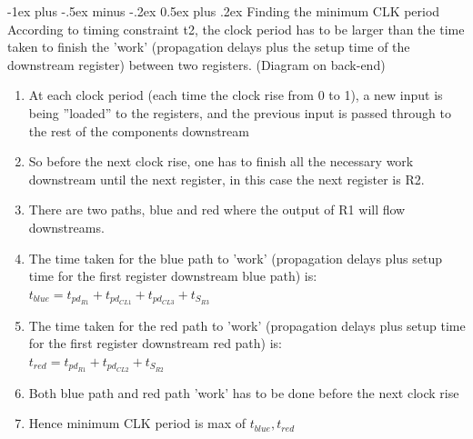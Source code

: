 \documentclass[9pt,landscape]{extarticle}
\makeatletter
\renewcommand{\section}{\@startsection{section}{1}{0mm}%
                                {-1ex plus -.5ex minus -.2ex}%
                                {0.5ex plus .2ex}%
                                {\normalfont\large\bfseries}}
\makeatother
\begin{document}
\begin{multicols*}{4}



\section{Finding the minimum CLK period}
According to timing constraint t2, the clock period has to be larger than the time
taken to finish the ’work’ (propagation delays plus the setup time of the downstream
register) between two registers. (Diagram on back-end)

\begin{enumerate}
\item At each clock period (each time the clock rise from 0 to 1), a new input is being
”loaded” to the registers, and the previous input is passed through to the rest
of the components downstream
\item So before the next clock rise, one has to finish all the necessary work downstream
until the next register, in this case the next register is R2.
\item There are two paths, blue and red where the output of R1 will flow downstreams.
\item The time taken for the blue path to ’work’ (propagation delays plus setup time
for the first register downstream blue path) is: \\
$t_{blue} = t_{pd_{R1}}+ t_{pd_{CL1}} + t_{pd_{CL3}} + t_{S_{R3}}$ \\
\item The time taken for the red path to ’work’ (propagation delays plus setup time
for the first register downstream red path) is: \\
$t_{red} = t_{pd_{R1}}+ t_{pd_{CL2}} + t_{S_{R2}}$ \\
\item Both blue path and red path ’work’ has to be done before the next clock rise 
\item Hence minimum CLK period is max of $t_{blue} , t_{red}$

\end{enumerate}



\end{multicols*}
\end{document}
